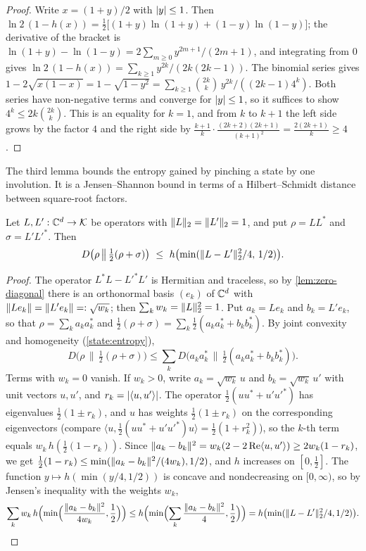 \begin{proof}
Write $x=(1+y)/2$ with $\lvert y\rvert\le1$. Then $\ln2\,(1-h(x))=\frac12\bigl[(1+y)\ln(1+y)+(1-y)\ln(1-y)\bigr]$; the derivative of the bracket is
$\ln(1+y)-\ln(1-y)=2\sum_{m\ge0}y^{2m+1}/(2m+1)$, and integrating from $0$ gives $\ln2\,(1-h(x))=\sum_{k\ge1}y^{2k}/(2k(2k-1))$. The
binomial series gives $1-2\sqrt{x(1-x)}=1-\sqrt{1-y^2}=\sum_{k\ge1}\binom{2k}k\,y^{2k}/((2k-1)4^k)$. Both series have non-negative terms and
converge for $\lvert y\rvert\le1$, so it suffices to show $4^k\le2k\binom{2k}k$. This is an equality for $k=1$, and from $k$ to $k+1$ the left side
grows by the factor $4$ and the right side by $\frac{k+1}k\cdot\frac{(2k+2)(2k+1)}{(k+1)^2}=\frac{2(2k+1)}k\ge4$.
\end{proof}

The third lemma bounds the entropy gained by pinching a state by one involution. It is a Jensen--Shannon bound in terms of a
Hilbert--Schmidt distance between square-root factors.

\begin{lemma}\label{lem:jensen-shannon}
Let $L,L':\mathbb C^d\to\mathcal K$ be operators with $\lVert L\rVert_2=\lVert L'\rVert_2=1$, and put $\rho=LL^*$ and $\sigma=L'L'^*$. Then
\[
D\bigl(\rho\,\big\|\,\tfrac12(\rho+\sigma)\bigr)\ \le\ h\bigl(\min(\hs{L-L'}^2/4,\,1/2)\bigr).
\]
\end{lemma}

\begin{proof}
The operator $L^*L-L'^*L'$ is Hermitian and traceless, so by \cref{lem:zero-diagonal} there is an orthonormal basis $(e_k)$ of $\mathbb C^d$ with
$\lVert Le_k\rVert=\lVert L'e_k\rVert=:\sqrt{w_k}$; then $\sum_kw_k=\lVert L\rVert_2^2=1$. Put $a_k=Le_k$ and $b_k=L'e_k$, so that $\rho=\sum_ka_ka_k^*$ and
$\frac12(\rho+\sigma)=\sum_k\frac12(a_ka_k^*+b_kb_k^*)$. By joint convexity and homogeneity (\cref{state:entropy}),
\[
D\bigl(\rho\,\big\|\,\tfrac12(\rho+\sigma)\bigr)\le\sum_kD\bigl(a_ka_k^*\,\big\|\,\tfrac12(a_ka_k^*+b_kb_k^*)\bigr).
\]
Terms with $w_k=0$ vanish. If $w_k>0$, write $a_k=\sqrt{w_k}\,u$ and $b_k=\sqrt{w_k}\,u'$ with unit vectors $u,u'$, and $r_k=\lvert \langle
u,u'\rangle\rvert$. The operator $\frac12(uu^*+u'u'^*)$ has eigenvalues $\frac12(1\pm r_k)$, and $u$ has weights $\frac12(1\pm r_k)$ on the
corresponding eigenvectors (compare $\langle u,\frac12(uu^*+u'u'^*)u\rangle=\frac12(1+r_k^2)$), so the $k$-th term equals
$w_k\,h(\frac12(1-r_k))$. Since $\lVert a_k-b_k\rVert^2=w_k(2-2\operatorname{Re}\langle u,u'\rangle)\ge2w_k(1-r_k)$, we get
$\frac12(1-r_k)\le\min(\lVert a_k-b_k\rVert^2/(4w_k),1/2)$, and $h$ increases on $[0,\frac12]$. The function $y\mapsto h(\min(y/4,1/2))$ is
concave and nondecreasing on $[0,\infty)$, so by Jensen's inequality with the weights $w_k$,
\[
\sum_kw_k\,h\Bigl(\min\Bigl(\frac{\lVert a_k-b_k\rVert^2}{4w_k},\frac12\Bigr)\Bigr)\le h\Bigl(\min\Bigl(\sum_k\frac{\lVert a_k-b_k\rVert^2}4,\frac12\Bigr)\Bigr)
=h\bigl(\min(\lVert L-L'\rVert_2^2/4,1/2)\bigr).\qedhere
\]
\end{proof}

